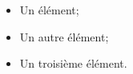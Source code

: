 \documentclass[a4paper,11pt]{report}
\begin{document}
\begin{itemize}
\item Un élément;
\item Un autre élément;
\item Un troisième élément.
\end{itemize}
\end{document}
